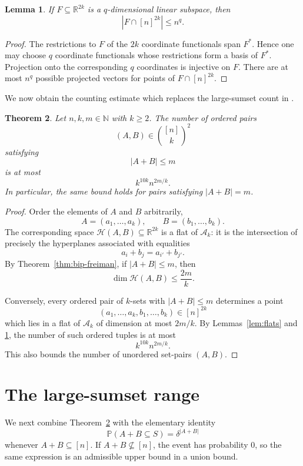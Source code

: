\documentclass[11pt]{article}
\newtheorem{theorem}{Theorem}[section]
\newtheorem{lemma}[theorem]{Lemma}
\newcommand{\N}{\mathbb{N}}
\newcommand{\R}{\mathbb{R}}
\newcommand{\Prob}{\mathbb{P}}
\newcommand{\cH}{\mathcal{H}}
\newcommand{\cA}{\mathcal{A}}
\begin{document}
\begin{lemma}\label{lem:lattice-flat}
If $F\subseteq\R^{2k}$ is a $q$-dimensional linear subspace, then
\[
 |F\cap[n]^{2k}|\le n^q.
\]
\end{lemma}

\begin{proof}
The restrictions to $F$ of the $2k$ coordinate functionals span $F^*$.  Hence one may choose $q$ coordinate functionals whose restrictions form a basis of $F^*$.  Projection onto the corresponding $q$ coordinates is injective on $F$.  There are at most $n^q$ possible projected vectors for points of $F\cap[n]^{2k}$.
\end{proof}

We now obtain the counting estimate which replaces the large-sumset count in \cite[Section 4]{DMS}.

\begin{theorem}\label{thm:pair-count}
Let $n,k,m\in\N$ with $k\ge2$.  The number of ordered pairs
\[
 (A,B)\in\binom{[n]}{k}^2
\]
satisfying
\[
 |A+B|\le m
\]
is at most
\[
 k^{10k}n^{2m/k}.
\]
In particular, the same bound holds for pairs satisfying $|A+B|=m$.
\end{theorem}

\begin{proof}
Order the elements of $A$ and $B$ arbitrarily,
\[
 A=(a_1,\ldots,a_k),\qquad B=(b_1,\ldots,b_k).
\]
The corresponding space $\cH(A,B)\subseteq\R^{2k}$ is a flat of $\cA_k$: it is the intersection of precisely the hyperplanes associated with equalities
\[
 a_i+b_j=a_{i'}+b_{j'}.
\]
By Theorem~\ref{thm:bip-freiman}, if $|A+B|\le m$, then
\[
 \dim\cH(A,B)\le \frac{2m}{k}.
\]

Conversely, every ordered pair of $k$-sets with $|A+B|\le m$ determines a point
\[
 (a_1,\ldots,a_k,b_1,\ldots,b_k)\in[n]^{2k}
\]
which lies in a flat of $\cA_k$ of dimension at most $2m/k$.  By Lemmas~\ref{lem:flats} and \ref{lem:lattice-flat}, the number of such ordered tuples is at most
\[
 k^{10k}n^{2m/k}.
\]
This also bounds the number of unordered set-pairs $(A,B)$.
\end{proof}

\section{The large-sumset range}

We next combine Theorem~\ref{thm:pair-count} with the elementary identity
\[
 \Prob(A+B\subseteq S)=\delta^{|A+B|}
\]
whenever $A+B\subseteq[n]$.  If $A+B\not\subseteq[n]$, the event has probability $0$, so the same expression is an admissible upper bound in a union bound.
\end{document}
